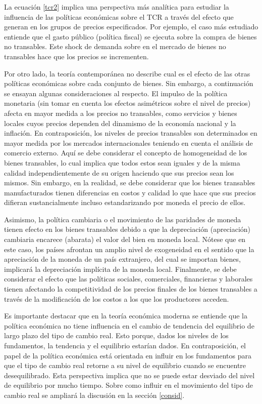 \documentclass[12pt,letterpaper]{article}
\begin{document}
La ecuación \ref{tcr2} implica una perspectiva más analítica para estudiar la influencia de las políticas económicas sobre el TCR a través del efecto que generan en los grupos de precios especificados. Por ejemplo, el caso más estudiado entiende que el gasto público (política fiscal) se ejecuta sobre la compra de bienes no transables. Este shock de demanda sobre en el mercado de bienes no transables hace que los precios se incrementen. 

Por otro lado, la teoría contemporánea no describe cual es el efecto de las otras políticas económicas sobre cada conjunto de bienes. Sin embargo, a continuación se ensayan algunas consideraciones al respecto. El impulso de la política monetaria (sin tomar en cuenta los efectos asimétricos sobre el nivel de precios) afecta en mayor medida a los precios no transables, como servicios y bienes locales cuyos precios dependen del dinamismo de la economía nacional y la inflación. En contraposición, los niveles de precios transables son determinados en mayor medida por los mercados internacionales teniendo en cuenta el análisis de comercio externo. Aquí se debe considerar el concepto de homogeneidad de los bienes transables, lo cual implica que todos estos sean iguales y de la misma calidad independientemente de su origen haciendo que sus precios sean los mismos. Sin embargo, en la realidad, se debe considerar que los bienes transables manufacturados tienen diferencias en costos y calidad lo que hace que sus precios difieran sustancialmente incluso estandarizando por moneda el precio de ellos. 

Asimismo, la política cambiaria o el movimiento de las paridades de moneda tienen efecto en los bienes transables debido a que la depreciación (apreciación) cambiaria encarece (abarata) el valor del bien en moneda local. Nótese que en este caso, los países afrontan un amplio nivel de exogeneidad en el sentido que la apreciación de la moneda de un país extranjero, del cual se importan bienes, implicará la depreciación implícita de la moneda local. Finalmente, se debe considerar el efecto que las políticas sociales, comerciales, financieras y laborales tienen afectando la competitividad de los precios finales de los bienes transables a través de la modificación de los costos a los que los productores acceden. 

Es importante destacar que en la teoría económica moderna se entiende que la política económica no tiene influencia en el cambio de tendencia del equilibrio de largo plazo del tipo de cambio real. Esto porque, dados los niveles de los fundamentos, la tendencia y el equilibrio estarían dados. En contraposición, el papel de la política económica está orientada en influir en los fundamentos para que el tipo de cambio real retorne a su nivel de equilibrio cuando se encuentre desequilibrado. Esta perspectiva implica que no se puede estar desviado del nivel de equilibrio por mucho tiempo. Sobre como influir en el movimiento del tipo de cambio real se ampliará la discusión en la sección \ref{consid}.
\end{document}
